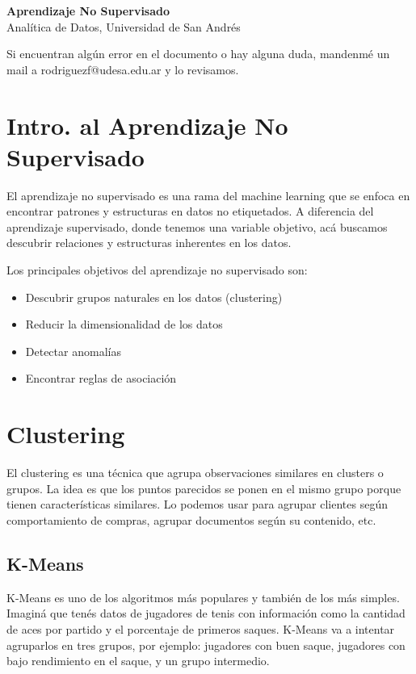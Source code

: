 \documentclass[12pt]{article}
\begin{document}
\begin{center}
  {\LARGE \textbf{Aprendizaje No Supervisado}}\\[0.5em]
  {Analítica de Datos, Universidad de San Andrés}
\end{center}

Si encuentran algún error en el documento o hay alguna duda, mandenmé un mail a rodriguezf@udesa.edu.ar y lo revisamos.

\section{Intro. al Aprendizaje No Supervisado}
El aprendizaje no supervisado es una rama del machine learning que se enfoca en encontrar patrones y estructuras en datos no etiquetados. A diferencia del aprendizaje supervisado, donde tenemos una variable objetivo, acá buscamos descubrir relaciones y estructuras inherentes en los datos.

\vspace{1em}

Los principales objetivos del aprendizaje no supervisado son:
\begin{itemize}
    \item Descubrir grupos naturales en los datos (clustering)
    \item Reducir la dimensionalidad de los datos
    \item Detectar anomalías
    \item Encontrar reglas de asociación
\end{itemize}

\section{Clustering}
El clustering es una técnica que agrupa observaciones similares en clusters o grupos. La idea es que los puntos parecidos se ponen en el mismo grupo porque tienen características similares. Lo podemos usar para agrupar clientes según comportamiento de compras, agrupar documentos según su contenido, etc.

\subsection{K-Means}
K-Means es uno de los algoritmos más populares y también de los más simples. Imaginá que tenés datos de jugadores de tenis con información como la cantidad de aces por partido y el porcentaje de primeros saques. K-Means va a intentar agruparlos en tres grupos, por ejemplo: jugadores con buen saque, jugadores con bajo rendimiento en el saque, y un grupo intermedio.
\end{document}
